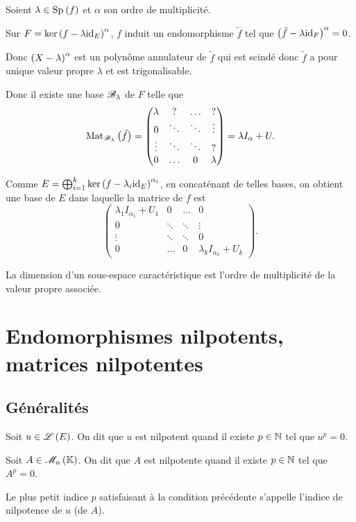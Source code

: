 \begin{dem}
Soient \(\lambda\in\Sp{f}\) et \(\alpha\) son ordre de multiplicité.

Sur \(F=\ker\left(f-\lambda\mathrm{id}_{E}\right)^\alpha\), \(f\) induit un endomorphisme \(\tilde{f}\) tel que \(\left(\tilde{f}-\lambda\mathrm{id}_{F}\right)^\alpha=0\).

Donc \(\left(X-\lambda\right)^\alpha\) est un polynôme annulateur de \(\tilde{f}\) qui est scindé donc \(\tilde{f}\) a pour unique valeur propre \(\lambda\) et est trigonalisable.

Donc il existe une base \(\mathscr{B}_\lambda\) de \(F\) telle que \[\Mat[\fami{B}_\lambda]{\tilde{f}}=\begin{pmatrix}
\lambda & ? & \dots & ? \\
0 & \ddots & \ddots & \vdots \\
\vdots & \ddots & \ddots & ? \\
0 & \dots & 0 & \lambda
\end{pmatrix}=\lambda I_\alpha+U.\]

Comme \(E=\bigoplus_{i=1}^k\ker\left(f-\lambda_i\mathrm{id}_{E}\right)^{\alpha_i}\), en concaténant de telles bases, on obtient une base de \(E\) dans laquelle la matrice de \(f\) est \[\begin{pmatrix}
\lambda_1I_{\alpha_1}+U_1 & 0 & \dots & 0 \\
0 & \ddots & \ddots & \vdots \\
\vdots & \ddots & \ddots & 0 \\
0 & \dots & 0 & \lambda_kI_{\alpha_k}+U_k
\end{pmatrix}.\]
\end{dem}

\begin{cor}
La dimension d'un sous-espace caractéristique est l'ordre de multiplicité de la valeur propre associée.
\end{cor}

\section{Endomorphismes nilpotents, matrices nilpotentes}

\subsection{Généralités}

\begin{defi}
Soit \(u\in\mathscr{L}\left(E\right)\). On dit que \(u\) est nilpotent quand il existe \(p\in\mathbb{N}\) tel que \(u^p=0\).

Soit \(A\in\M{n}\). On dit que \(A\) est nilpotente quand il existe \(p\in\mathbb{N}\) tel que \(A^p=0\).

Le plus petit indice \(p\) satisfaisant à la condition précédente s'appelle l'indice de nilpotence de \(u\) (de \(A\)).
\end{defi}

